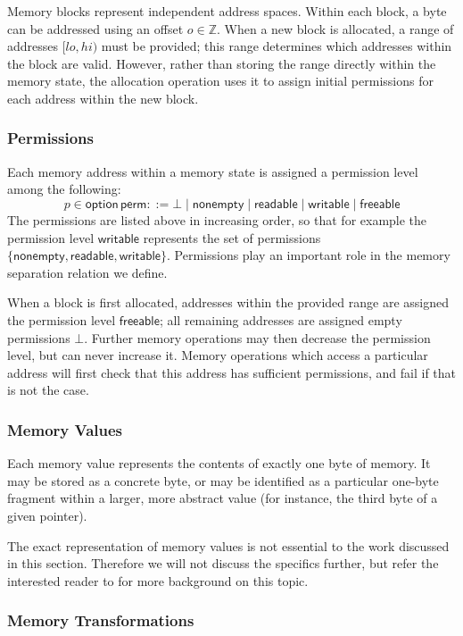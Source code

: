 \documentclass[acmsmall,screen,review,anonymous]{acmart}
\newcommand{\kw}[1]{\ensuremath{ \mathsf{#1} }}
\begin{document}
Memory blocks represent independent address spaces.
Within each block,
a byte can be addressed using an offset $o \in \mathbb{Z}$.
When a new block is allocated,
a range of addresses $[\mathit{lo}, \mathit{hi})$ must be provided;
this range determines which addresses within the block are valid.
However,
rather than storing the range directly within the memory state,
the allocation operation uses it to assign initial permissions
for each address within the new block.

\subsubsection{Permissions}

Each memory address within a memory state
is assigned a permission level among the following:
\[
  p \in \kw{option}\,\kw{perm} ::=
    \bot \mid
    \kw{nonempty} \mid
    \kw{readable} \mid
    \kw{writable} \mid
    \kw{freeable}
\]
The permissions are listed above in increasing order,
so that for example the permission level $\kw{writable}$ 
represents the set of permissions
$\{ \kw{nonempty}, \kw{readable}, \kw{writable} \}$.
Permissions play an important role
in the memory separation relation we define.

When a block is first allocated,
addresses within the provided range
are assigned the permission level $\kw{freeable}$;
all remaining addresses are assigned
empty permissions $\bot$.
Further memory operations may then decrease the permission level,
but can never increase it.
Memory operations which access a particular address
will first check that this address has sufficient permissions,
and fail if that is not the case.

\subsubsection{Memory Values}

Each memory value represents the contents of exactly one byte of memory.
It may be stored as a concrete byte,
or may be identified as a particular one-byte fragment
within a larger, more abstract value
(for instance, the third byte of a given pointer).

The exact representation of memory values
is not essential to the work discussed in this section.
Therefore
we will not discuss the specifics further,
but refer the interested reader to \citet{compcertmmv2}
for more background on this topic.

\subsubsection{Memory Transformations}
\end{document}
